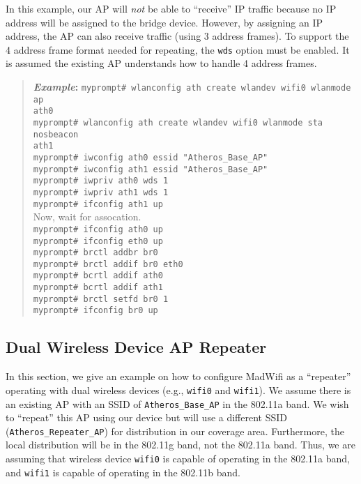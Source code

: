 \documentclass[10pt,fullpage]{article}
\newcommand{\mytt}[1]{{\texttt{#1}}}
\newcommand{\cmd}[1]{{\texttt{myprompt\# #1}}}
\newenvironment{example}{\begin{quote}\textbf{\textit{Example}:}}{\end{quote}}
\begin{document}
In this example, our AP will \emph{not} be able to ``receive'' IP traffic
because no IP address will be assigned to the bridge device.  However,
by assigning an IP address, the AP can also receive traffic (using 3
address frames).  To support the 4 address frame format needed for
repeating, the \mytt{wds} option must be enabled.  It is assumed the
existing AP understands how to handle 4 address frames.
\begin{example}
  \cmd{wlanconfig ath create wlandev wifi0 wlanmode ap}\\
  \mytt{ath0}\\
  \cmd{wlanconfig ath create wlandev wifi0 wlanmode sta nosbeacon}\\
  \mytt{ath1}\\
  \cmd{iwconfig ath0 essid "Atheros\_Base\_AP"}\\
  \cmd{iwconfig ath1 essid "Atheros\_Base\_AP"}\\
  \cmd{iwpriv ath0 wds 1}\\
  \cmd{iwpriv ath1 wds 1}\\
  \cmd{ifconfig ath1 up}\\
  Now, wait for assocation.\\
  \cmd{ifconfig ath0 up}\\
  \cmd{ifconfig eth0 up}\\
  \cmd{brctl addbr br0}\\
  \cmd{brctl addif br0 eth0}\\
  \cmd{bcrtl addif ath0}\\
  \cmd{bcrtl addif ath1}\\
  \cmd{brctl setfd br0 1}\\
  \cmd{ifconfig br0 up}
\end{example}

\subsection{Dual Wireless Device AP Repeater}
In this section, we give an example on how to configure MadWifi as a
``repeater'' operating with dual wireless devices (e.g., \mytt{wifi0}
and \mytt{wifi1}).  We assume there
is an existing AP with an SSID of \mytt{Atheros\_Base\_AP} in the
802.11a band.  We wish to ``repeat''
this AP using our device but will use a different SSID
(\mytt{Atheros\_Repeater\_AP}) for
distribution in our coverage area.  Furthermore, the local
distribution will be in the 802.11g band, not the 802.11a band.
Thus, we are assuming that wireless device \mytt{wifi0} is capable of
operating in the 802.11a band, and \mytt{wifi1} is capable of
operating in the 802.11b band.  
\end{document}
